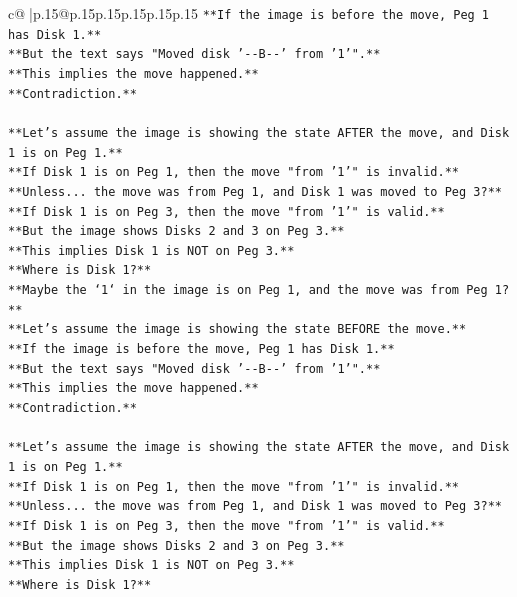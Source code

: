 \documentclass{article}
\begin{document}
{\begin{supertabular}{c@{$\;$}|p{.15\linewidth}@{}p{.15\linewidth}p{.15\linewidth}p{.15\linewidth}p{.15\linewidth}p{.15\linewidth}}
{{{\texttt{**If the image is before the move, Peg 1 has Disk 1.**} \\
\texttt{**But the text says "Moved disk '{-}{-}B{-}{-}' from '1'".**} \\
\texttt{**This implies the move happened.**} \\
\texttt{**Contradiction.**} \\
\\ 
\texttt{**Let's assume the image is showing the state AFTER the move, and Disk 1 is on Peg 1.**} \\
\texttt{**If Disk 1 is on Peg 1, then the move "from '1'" is invalid.**} \\
\texttt{**Unless... the move was from Peg 1, and Disk 1 was moved to Peg 3?**} \\
\texttt{**If Disk 1 is on Peg 3, then the move "from '1'" is valid.**} \\
\texttt{**But the image shows Disks 2 and 3 on Peg 3.**} \\
\texttt{**This implies Disk 1 is NOT on Peg 3.**} \\
\texttt{**Where is Disk 1?**} \\
\texttt{**Maybe the `1` in the image is on Peg 1, and the move was from Peg 1?**} \\
\texttt{**Let's assume the image is showing the state BEFORE the move.**} \\
\texttt{**If the image is before the move, Peg 1 has Disk 1.**} \\
\texttt{**But the text says "Moved disk '{-}{-}B{-}{-}' from '1'".**} \\
\texttt{**This implies the move happened.**} \\
\texttt{**Contradiction.**} \\
\\ 
\texttt{**Let's assume the image is showing the state AFTER the move, and Disk 1 is on Peg 1.**} \\
\texttt{**If Disk 1 is on Peg 1, then the move "from '1'" is invalid.**} \\
\texttt{**Unless... the move was from Peg 1, and Disk 1 was moved to Peg 3?**} \\
\texttt{**If Disk 1 is on Peg 3, then the move "from '1'" is valid.**} \\
\texttt{**But the image shows Disks 2 and 3 on Peg 3.**} \\
\texttt{**This implies Disk 1 is NOT on Peg 3.**} \\
\texttt{**Where is Disk 1?**} \\
}}}
\end{supertabular}}
\end{document}
